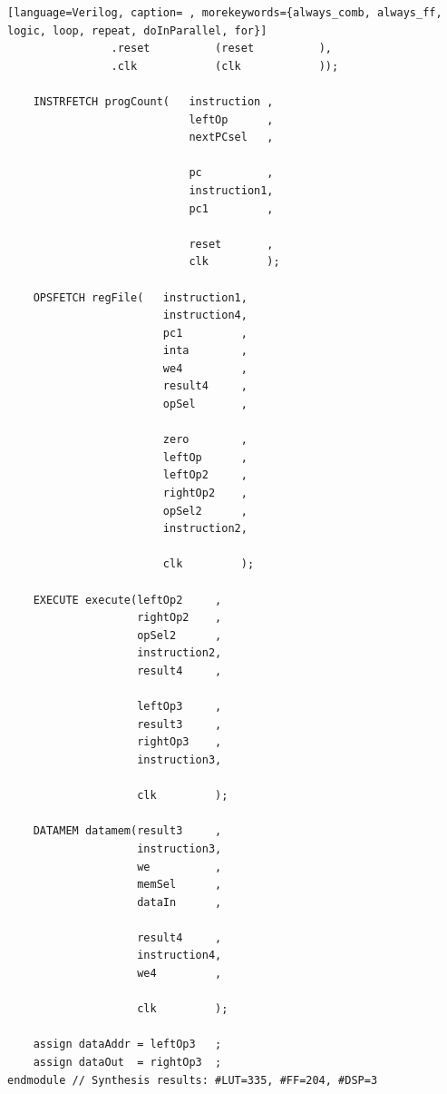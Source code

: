 {\begin{shaded*}
\begin{lstlisting}[language=Verilog, caption= , morekeywords={always_comb, always_ff, logic, loop, repeat, doInParallel, for}]
                .reset          (reset          ),
                .clk            (clk            ));

    INSTRFETCH progCount(   instruction ,
                            leftOp      ,
                            nextPCsel   ,

                            pc          ,
                            instruction1,
                            pc1         ,

                            reset       ,
                            clk         );

    OPSFETCH regFile(   instruction1,
                        instruction4,
                        pc1         ,
                        inta        ,
                        we4         ,
                        result4     ,
                        opSel       ,

                        zero        ,
                        leftOp      ,
                        leftOp2     ,
                        rightOp2    ,
                        opSel2      ,
                        instruction2,

                        clk         );

    EXECUTE execute(leftOp2     ,
                    rightOp2    ,
                    opSel2      ,
                    instruction2,
                    result4     ,

                    leftOp3     ,
                    result3     ,
                    rightOp3    ,
                    instruction3,

                    clk         );

    DATAMEM datamem(result3     ,
                    instruction3,
                    we          ,
                    memSel      ,
                    dataIn      ,

                    result4     ,
                    instruction4,
                    we4         ,

                    clk         );

    assign dataAddr = leftOp3   ;
    assign dataOut  = rightOp3  ;
endmodule // Synthesis results: #LUT=335, #FF=204, #DSP=3
\end{lstlisting}
\end{shaded*}
}

